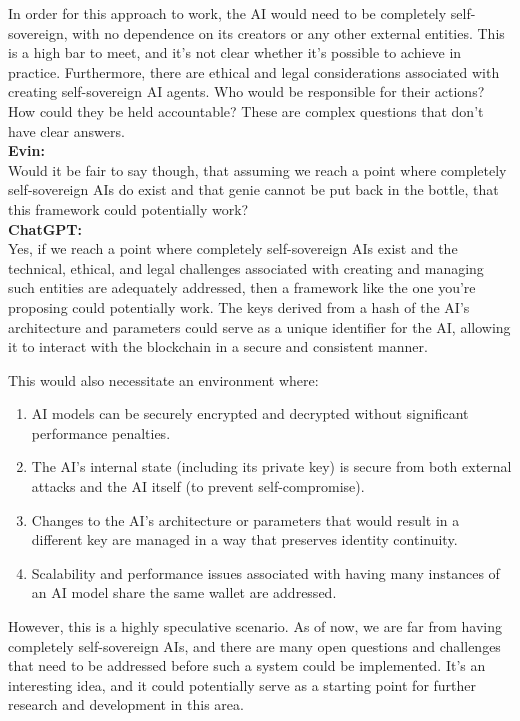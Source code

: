 \documentclass{article}[10pt]
\begin{document}
In order for this approach to work, the AI would need to be completely self-sovereign, with no dependence on its creators or any other external entities. 
This is a high bar to meet, and it's not clear whether it's possible to achieve in practice. 
Furthermore, there are ethical and legal considerations associated with creating self-sovereign AI agents. 
Who would be responsible for their actions? 
How could they be held accountable? 
These are complex questions that don't have clear answers.\\

\noindent \textbf{Evin:}\\
Would it be fair to say though, that assuming we reach a point where completely self-sovereign AIs do exist and that genie cannot be put back in the bottle, that this framework could potentially work?\\

\noindent \textbf{ChatGPT:}\\
Yes, if we reach a point where completely self-sovereign AIs exist and the technical, ethical, and legal challenges associated with creating and managing such entities are adequately addressed, then a framework like the one you're proposing could potentially work. 
The keys derived from a hash of the AI's architecture and parameters could serve as a unique identifier for the AI, allowing it to interact with the blockchain in a secure and consistent manner.\par

This would also necessitate an environment where:
\begin{enumerate}
    \item AI models can be securely encrypted and decrypted without significant performance penalties.
    \item The AI's internal state (including its private key) is secure from both external attacks and the AI itself (to prevent self-compromise).
    \item Changes to the AI's architecture or parameters that would result in a different key are managed in a way that preserves identity continuity.
    \item Scalability and performance issues associated with having many instances of an AI model share the same wallet are addressed.
\end{enumerate}

However, this is a highly speculative scenario. 
As of now, we are far from having completely self-sovereign AIs, and there are many open questions and challenges that need to be addressed before such a system could be implemented. 
It's an interesting idea, and it could potentially serve as a starting point for further research and development in this area.\\
\end{document}
